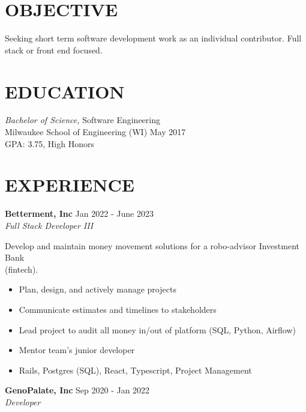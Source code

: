 \documentclass[line,margin]{res}
\begin{document}

\address{austin.dev@protonmail.com | (414) 334-4061}

\begin{resume}

\section{OBJECTIVE}
Seeking short term software development work as an individual contributor. Full stack or front end focused.

\section{EDUCATION}
{\sl Bachelor of Science,} Software Engineering \\
Milwaukee School of Engineering (WI) \hfill May 2017 \\
GPA: 3.75, High Honors \\

\section{EXPERIENCE}

\textbf{Betterment, Inc} \hfill Jan 2022 - June 2023 \\
{\sl Full Stack Developer III}

Develop and maintain money movement solutions for a robo-advisor Investment Bank \\ (fintech).

\begin{itemize}
\item Plan, design, and actively manage projects
\item Communicate estimates and timelines to stakeholders
\item Lead project to audit all money in/out of platform (SQL, Python, Airflow)
\item Mentor team's junior developer
\item Rails, Postgres (SQL), React, Typescript, Project Management
\end{itemize}

\textbf{GenoPalate, Inc} \hfill Sep 2020 - Jan 2022 \\
{\sl Developer}


\end{resume}
\end{document}
